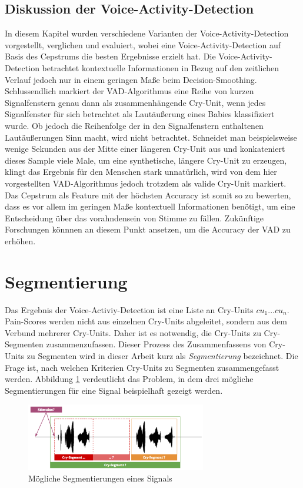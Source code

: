 \subsection{Diskussion der Voice-Activity-Detection}

In diesem Kapitel wurden verschiedene Varianten der Voice-Activity-Detection vorgestellt, verglichen und evaluiert, wobei eine Voice-Activity-Detection auf Basis des Cepstrums die besten Ergebnisse erzielt hat. Die Voice-Activity-Detection betrachtet kontextuelle Informationen in Bezug auf den zeitlichen Verlauf jedoch nur in einem geringen Maße beim Decision-Smoothing. Schlussendlich markiert der VAD-Algorithmus eine Reihe von kurzen Signalfenstern genau dann als zusammenhängende Cry-Unit, wenn jedes Signalfenster für sich betrachtet als Lautäußerung eines Babies klassifiziert wurde. Ob jedoch die Reihenfolge der in den Signalfenstern enthaltenen Lautäußerungen Sinn macht, wird nicht betrachtet. Schneidet man beispielsweise wenige Sekunden aus der Mitte einer längeren Cry-Unit aus und konkateniert dieses Sample viele Male, um eine synthetische, längere Cry-Unit zu erzeugen, klingt das Ergebnis für den Menschen stark unnatürlich, wird von dem hier vorgestellten VAD-Algorithmus jedoch trotzdem als valide Cry-Unit markiert. Das Cepstrum als Feature mit der höchsten Accuracy ist somit so zu bewerten, dass es vor allem im geringen Maße kontextuell Informationen benötigt, um eine Entscheidung über das vorahndensein von Stimme zu fällen. Zukünftige Forschungen könnnen an diesem Punkt ansetzen, um die Accuracy der VAD zu erhöhen.

\section{Segmentierung}
\label{sec:segmenting}
Das Ergebnis der Voice-Activiy-Detection ist eine Liste an Cry-Units  $cu_1 ... cu_n$. Pain-Scores werden nicht aus einzelnen Cry-Units abgeleitet, sondern aus dem Verbund mehrerer Cry-Units. Daher ist es notwendig, die Cry-Units zu Cry-Segmenten zusammenzufassen. Dieser Prozess des Zusammenfassens von Cry-Units zu Segmenten wird in dieser Arbeit kurz als \emph{Segmentierung} bezeichnet. Die Frage ist, nach welchen Kriterien Cry-Units zu Segmenten zusammengefasst werden. Abbildung \ref{img:segmenting02} verdeutlicht das Problem, in dem drei mögliche Segmentierungen für eine Signal beispielhaft gezeigt werden.

\begin{figure}[H]
	\centering
	\includegraphics[width=0.7\textwidth]{bilder/segmentierung07.png}
	\caption{Mögliche Segmentierungen eines Signals}
	\label{img:segmenting02}
\end{figure}

